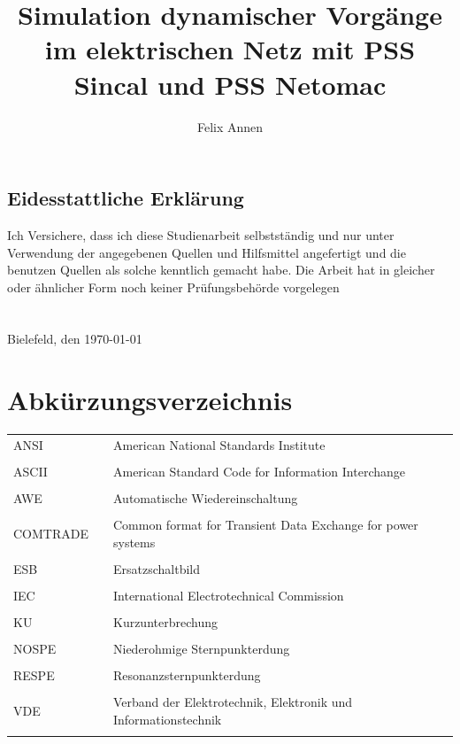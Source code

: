 \documentclass{scrartcl}
\title{Simulation dynamischer Vorgänge im elektrischen Netz mit PSS Sincal und PSS Netomac}
\author{Felix Annen}
\begin{document}
\begin{titlepage}



\maketitle
\thispagestyle{empty}
\newpage
	\subsection*{Eidesstattliche Erklärung}
	\glqq Ich Versichere, dass ich diese Studienarbeit selbstständig und nur unter Verwendung der angegebenen Quellen und Hilfsmittel angefertigt und die benutzen Quellen als solche kenntlich gemacht habe. Die Arbeit hat in gleicher oder ähnlicher Form noch keiner Prüfungsbehörde vorgelegen\grqq \\ \\ \\
	Bielefeld, den \today


\end{titlepage}


	\setcounter{page}{1}
	\tableofcontents
	\newpage
	\listoffigures
	
	\listoftables
	
	\newpage
	\section*{Abkürzungsverzeichnis}
	\begin{tabular}{lll}
	ANSI & & American National Standards Institute \\ \\
	ASCII & & American Standard Code for Information Interchange \\ \\
	AWE & & Automatische Wiedereinschaltung \\ \\
	COMTRADE & & Common format for Transient Data Exchange for power systems \\ \\
	ESB & & Ersatzschaltbild \\ \\
	IEC & & International Electrotechnical Commission \\ \\
	KU & & Kurzunterbrechung \\ \\
	NOSPE & & Niederohmige Sternpunkterdung\\ \\
	RESPE & & Resonanzsternpunkterdung\\ \\
	VDE & & Verband der Elektrotechnik, Elektronik und Informationstechnik \\ \\
	
	\end{tabular}
	
\end{document}
